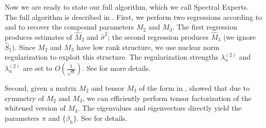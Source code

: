 
Now we are ready to state our full algorithm, which we call Spectral Experts.
The full algorithm is described in .
First, we perform two regressions according to 
and  to recover the compound parameters $M_2$ and $M_3$.
The first regression 
produces estimates of $\hat M_2$ and $\hat\sigma^2$;
the second regression  produces $\hat M_3$ (we ignore $\hat S_1$).
Since $M_2$ and $M_3$ have low rank structure,
we use nuclear norm regularization \cite{Tomioka2011,NegahbanWainwright2009}
to exploit this structure.
The regularization strengths $\lambda_n^{(2)}$ and $\lambda_n^{(2)}$
are set to $O(\frac{1}{\sqrt{n}})$.
See  for more details.

Second, given a matrix $M_2$ and tensor $M_3$ of the form in ,
\citet{AnandkumarGeHsu2012} showed that due to symmetry of $M_2$ and $M_3$,
we can efficiently perform tensor factorization of the whitened
version of $M_3$.  The eigenvalues and eigenvectors
directly yield the parameters $\pi$ and
$\{\beta_h\}$.
See  for details.



